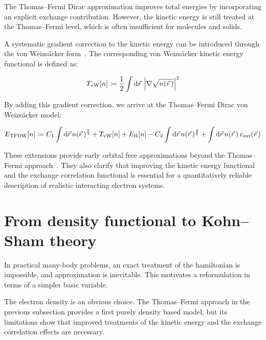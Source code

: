 The Thomas--Fermi Dirac approximation improves total energies by incorporating an explicit exchange contribution.
However, the kinetic energy is still treated at the Thomas--Fermi level, which is often insufficient for molecules and solids.

A systematic gradient correction to the kinetic energy can be introduced through the von Weizsäcker form~\cite{yang1986gradient}.
The corresponding von Weizsäcker kinetic energy functional is defined as:

\begin{equation}
    T_\mathrm{vW}[n]\coloneqq \frac{1}{2}\int\mathrm{d}{\vec{r}}\,\left|\nabla\sqrt{n(\vec{r}\,)}\right|^2
\label{von_Weizsaecker_kinetic}
\end{equation}

By adding this gradient correction, we arrive at the Thomas--Fermi Dirac von Weizsäcker model:

\begin{equation}
    E_\mathrm{TFDW}[n]
    \coloneqq C_1\int\mathrm{d}{\vec{r}}\,n(\vec{r}\,)^{\frac{5}{3}}
    + T_\mathrm{vW}[n]
    + E_\mathrm{H}[n]
    - C_2\int\mathrm{d}{\vec{r}}\,n(\vec{r}\,)^{\frac{4}{3}}
    + \int\mathrm{d}{\vec{r}}\,n(\vec{r}\,)\,v_\mathrm{ext}(\vec{r}\,)
\label{TFDW_functional}
\end{equation}

These extensions provide early orbital free approximations beyond the Thomas--Fermi approach~\cite{lieb1981thomas}.
They also clarify that improving the kinetic energy functional and the exchange correlation functional is essential for a quantitatively reliable description of realistic interacting electron systems.

\newpage
\section{From density functional to Kohn--Sham theory}
\label{sec:from_density_functional_to_Kohn_Sham_theory}

In practical many-body problems, an exact treatment of the hamiltonian is impossible, and approximation is inevitable.
This motivates a reformulation in terms of a simpler basic variable.

The electron density is an obvious choice.
The Thomas--Fermi approach in the previous subsection provides a first purely density based model, but its limitations show that improved treatments of the kinetic energy and the exchange correlation effects are necessary.

